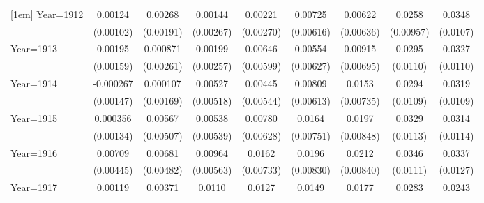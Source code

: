 \begin{table}[htbp]
\begin{tabular}{l*{8}{c}}
[1em]
Year=1912           &     0.00124         &     0.00268         &     0.00144         &     0.00221         &     0.00725         &     0.00622         &      0.0258\sym{***}&      0.0348\sym{***}\\
                    &   (0.00102)         &   (0.00191)         &   (0.00267)         &   (0.00270)         &   (0.00616)         &   (0.00636)         &   (0.00957)         &    (0.0107)         \\
[1em]
Year=1913           &     0.00195         &    0.000871         &     0.00199         &     0.00646         &     0.00554         &     0.00915         &      0.0295\sym{***}&      0.0327\sym{***}\\
                    &   (0.00159)         &   (0.00261)         &   (0.00257)         &   (0.00599)         &   (0.00627)         &   (0.00695)         &    (0.0110)         &    (0.0110)         \\
[1em]
Year=1914           &   -0.000267         &    0.000107         &     0.00527         &     0.00445         &     0.00809         &      0.0153\sym{**} &      0.0294\sym{***}&      0.0319\sym{***}\\
                    &   (0.00147)         &   (0.00169)         &   (0.00518)         &   (0.00544)         &   (0.00613)         &   (0.00735)         &    (0.0109)         &    (0.0109)         \\
[1em]
Year=1915           &    0.000356         &     0.00567         &     0.00538         &     0.00780         &      0.0164\sym{**} &      0.0197\sym{**} &      0.0329\sym{***}&      0.0314\sym{***}\\
                    &   (0.00134)         &   (0.00507)         &   (0.00539)         &   (0.00628)         &   (0.00751)         &   (0.00848)         &    (0.0113)         &    (0.0114)         \\
[1em]
Year=1916           &     0.00709         &     0.00681         &     0.00964\sym{*}  &      0.0162\sym{**} &      0.0196\sym{**} &      0.0212\sym{**} &      0.0346\sym{***}&      0.0337\sym{***}\\
                    &   (0.00445)         &   (0.00482)         &   (0.00563)         &   (0.00733)         &   (0.00830)         &   (0.00840)         &    (0.0111)         &    (0.0127)         \\
[1em]
Year=1917           &     0.00119         &     0.00371\sym{*}  &      0.0110\sym{**} &      0.0127\sym{**} &      0.0149\sym{**} &      0.0177\sym{***}&      0.0283\sym{***}&      0.0243         \\

\end{tabular}
\end{table}

